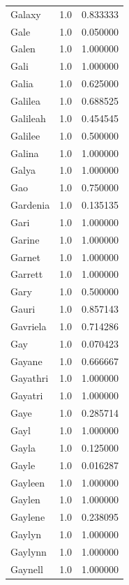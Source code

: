 \documentclass[
  letterpaper,
  DIV=11,
  numbers=noendperiod]{scrreprt}
\begin{document}
\begin{tabular}{lrr}
Galaxy          &   1.0 &   0.833333 \\
Gale            &   1.0 &   0.050000 \\
Galen           &   1.0 &   1.000000 \\
Gali            &   1.0 &   1.000000 \\
Galia           &   1.0 &   0.625000 \\
Galilea         &   1.0 &   0.688525 \\
Galileah        &   1.0 &   0.454545 \\
Galilee         &   1.0 &   0.500000 \\
Galina          &   1.0 &   1.000000 \\
Galya           &   1.0 &   1.000000 \\
Gao             &   1.0 &   0.750000 \\
Gardenia        &   1.0 &   0.135135 \\
Gari            &   1.0 &   1.000000 \\
Garine          &   1.0 &   1.000000 \\
Garnet          &   1.0 &   1.000000 \\
Garrett         &   1.0 &   1.000000 \\
Gary            &   1.0 &   0.500000 \\
Gauri           &   1.0 &   0.857143 \\
Gavriela        &   1.0 &   0.714286 \\
Gay             &   1.0 &   0.070423 \\
Gayane          &   1.0 &   0.666667 \\
Gayathri        &   1.0 &   1.000000 \\
Gayatri         &   1.0 &   1.000000 \\
Gaye            &   1.0 &   0.285714 \\
Gayl            &   1.0 &   1.000000 \\
Gayla           &   1.0 &   0.125000 \\
Gayle           &   1.0 &   0.016287 \\
Gayleen         &   1.0 &   1.000000 \\
Gaylen          &   1.0 &   1.000000 \\
Gaylene         &   1.0 &   0.238095 \\
Gaylyn          &   1.0 &   1.000000 \\
Gaylynn         &   1.0 &   1.000000 \\
Gaynell         &   1.0 &   1.000000 \\

\end{tabular}
\end{document}
